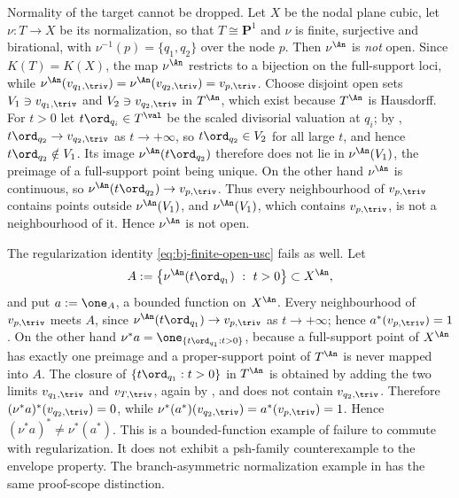 \begin{example}
\label{ex:ch41-node-not-open}
Normality of the target cannot be dropped.  Let $X$ be the nodal plane
cubic, let $\nu:T\to X$ be its normalization, so that $T\cong\mathbf P^1$
and $\nu$ is finite, surjective and birational, with
$\nu^{-1}(p)=\{q_1,q_2\}$ over the node $p$.  Then $\nu^{\An}$ is
\emph{not} open.  Since $K(T)=K(X)$, the map $\nu^{\An}$ restricts to a
bijection on the full-support loci, while
$\nu^{\An}(v_{q_1,\triv})=\nu^{\An}(v_{q_2,\triv})=v_{p,\triv}$.  Choose
disjoint open sets $V_1\ni v_{q_1,\triv}$ and $V_2\ni v_{q_2,\triv}$ in
$T^{\An}$, which exist because $T^{\An}$ is Hausdorff.  For $t>0$ let
$t\ord_{q_i}\in T^{\val}$ be the scaled divisorial valuation at $q_i$;
by , $t\ord_{q_2}\to v_{q_2,\triv}$ as
$t\to+\infty$, so $t\ord_{q_2}\in V_2$ for all large $t$, and hence
$t\ord_{q_2}\notin V_1$.  Its image $\nu^{\An}(t\ord_{q_2})$ therefore
does not lie in $\nu^{\An}(V_1)$, the preimage of a full-support point
being unique.  On the other hand $\nu^{\An}$ is continuous, so
$\nu^{\An}(t\ord_{q_2})\to v_{p,\triv}$.  Thus every neighbourhood of
$v_{p,\triv}$ contains points outside $\nu^{\An}(V_1)$, and
$\nu^{\An}(V_1)$, which contains $v_{p,\triv}$, is not a neighbourhood
of it.  Hence $\nu^{\An}$ is not open.

The regularization identity \eqref{eq:bj-finite-open-usc} fails as well.
Let
\[
 A:=\bigl\{\nu^{\An}(t\ord_{q_1})\ :\ t>0\bigr\}\subset X^{\An},
\]
and put $a:=\one_A$, a bounded function on $X^{\An}$.  Every
neighbourhood of $v_{p,\triv}$ meets $A$, since
$\nu^{\An}(t\ord_{q_1})\to v_{p,\triv}$ as $t\to+\infty$; hence
$a^*(v_{p,\triv})=1$.  On the other hand
$\nu^*a=\one_{\{t\ord_{q_1}:t>0\}}$, because a full-support point of
$X^{\An}$ has exactly one preimage and a proper-support point of
$T^{\An}$ is never mapped into $A$.  The closure of
$\{t\ord_{q_1}:t>0\}$ in $T^{\An}$ is obtained by adding the two limits
$v_{q_1,\triv}$ and $v_{T,\triv}$, again by
, and does not contain $v_{q_2,\triv}$.
Therefore $(\nu^*a)^*(v_{q_2,\triv})=0$, while
$\nu^*(a^*)(v_{q_2,\triv})=a^*(v_{p,\triv})=1$.  Hence
$(\nu^*a)^*\ne\nu^*(a^*)$.
This is a bounded-function example of failure to commute with
regularization.  It does not exhibit a psh-family counterexample to
the envelope property.  The branch-asymmetric normalization example
in  has the same proof-scope distinction.
\end{example}

